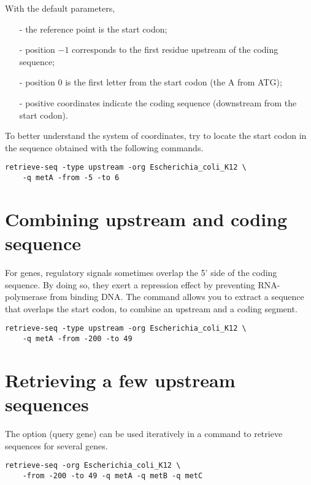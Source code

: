 \begin{samepage}
With the default parameters, 
\begin{itemize}
\item[-] the reference point is the start codon;
\item[-] position $-1$ corresponds to the first residue upstream of
  the coding sequence; 
\item[-] position 0 is the first letter from the start codon (the A from
  ATG);
\item[-] positive coordinates indicate the coding sequence (downstream
  from the start codon).
\end{itemize}
\end{samepage}

To better understand the system of coordinates, try to locate the
start codon in the sequence obtained with the following commands.

\begin{lstlisting}
retrieve-seq -type upstream -org Escherichia_coli_K12 \
    -q metA -from -5 -to 6
\end{lstlisting}


\section{Combining upstream and coding sequence}

For  genes, regulatory signals sometimes overlap the 5'
side of the coding sequence. By doing so, they exert a repression
effect by preventing RNA-polymerase from binding DNA. The command
\program{retrieve-seq} allows you to extract a sequence that overlaps
the start codon, to combine an upstream and a coding segment.

\begin{lstlisting}
retrieve-seq -type upstream -org Escherichia_coli_K12 \
    -q metA -from -200 -to 49
\end{lstlisting}

\section{Retrieving a few upstream sequences}

The option  (query gene) can be used iteratively in a
command to retrieve sequences for several genes.

\begin{lstlisting}
retrieve-seq -org Escherichia_coli_K12 \
    -from -200 -to 49 -q metA -q metB -q metC
\end{lstlisting}

